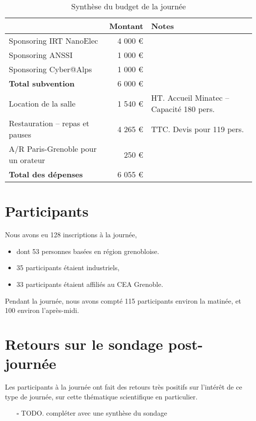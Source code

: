 \documentclass[a4paper,11pt]{article}
\begin{document}
\begin{table}[h]
\caption{\label{tab:org3171cd3}
Synthèse du budget de la journée}
\centering
\begin{tabular}{lrl}
\hline
 & Montant & Notes\\
\hline
Sponsoring IRT NanoElec & 4 000 € & \\
Sponsoring ANSSI & 1 000 € & \\
Sponsoring Cyber@Alps & 1 000 € & \\
\hline
\textbf{Total subvention} & 6 000 € & \\
\hline
\hline
Location de la salle & 1 540 € & HT. Accueil Minatec – Capacité 180 pers.\\
Restauration – repas et pauses & 4 265 € & TTC. Devis pour 119 pers.\\
A/R Paris-Grenoble pour un orateur & 250 € & \\
\hline
\textbf{Total des dépenses} & 6 055 € & \\
\hline
\end{tabular}
\end{table}

\section{Participants}
\label{sec:org9ed788b}

Nous avons eu 128 inscriptions à la journée,

\begin{itemize}
\item dont 53 personnes basées en région grenobloise.
\item 35 participants étaient industriels,
\item 33 participants étaient affiliés au CEA Grenoble.
\end{itemize}

Pendant la journée, nous avons compté 115 participants environ la
matinée, et 100 environ l'après-midi.

\section{Retours sur le sondage post-journée}
\label{sec:orgfc8a97d}

Les participants à la journée ont fait des retours très positifs sur
l'intérêt de ce type de journée, sur cette thématique scientifique en
particulier.

\begin{itemize}
\item[{$\square$}] TODO.  compléter avec une synthèse du sondage
\end{itemize}
\end{document}
